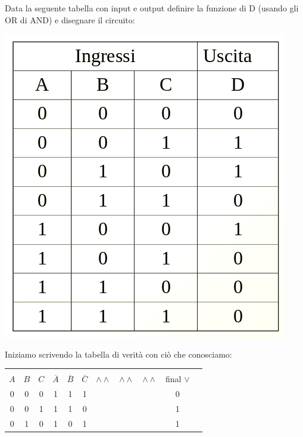 \documentclass[a4paper,12pt, oneside]{book}
\begin{document}
\begin{esercizio}
	Data la seguente tabella con input e output definire la funzione di D (usando gli OR di AND) e disegnare il circuito:
	\begin{center}
		\includegraphics[scale=0.7]{img/es3.png}
	\end{center}
	Iniziamo scrivendo la tabella di verità con ciò che conosciamo:
	\begin{center}
		\begin{tabular}{|c|c|c|c|c|c|c|c|c|c|c|}
			\hline
			    &     &     &                &                &                &                  &                  &                 &              \\
			$A$ & $B$ & $C$ & $\overline{A}$ & $\overline{B}$ & $\overline{C}$ & $\wedge \wedge $ & $\wedge \wedge $ & $\wedge \wedge$ & final $\vee$ \\
			\hline
			0   & 0   & 0   & 1              & 1              & 1              &                  &                  &                 & 0            \\
			\hline
			0   & 0   & 1   & 1              & 1              & 0              &                  &                  &                 & 1            \\
			\hline
			0   & 1   & 0   & 1              & 0              & 1              &                  &                  &                 & 1            \\

\end{tabular}
\end{center}
\end{esercizio}
\end{document}
